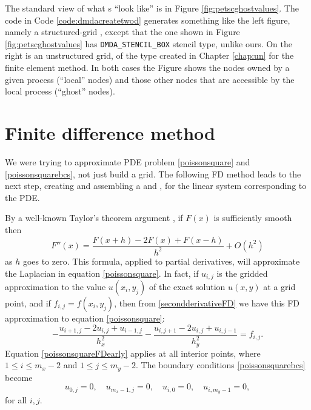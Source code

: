 The standard \PETSc view of what \pDM s ``look like'' is in Figure \ref{fig:petscghostvalues}.  The code in Code \ref{code:dmdacreatetwod} generates something like the left figure, namely a structured-grid \pDM, except that the one shown in Figure \ref{fig:petscghostvalues} has \texttt{DMDA\_STENCIL\_BOX} stencil type, unlike ours.  On the right is an unstructured grid, of the type created in Chapter \ref{chap:un} for the finite element method.  In both cases the Figure shows the nodes owned by a given process (``local'' nodes) and those other nodes that are accessible by the local process (``ghost'' nodes).


\section{Finite difference method}

We were trying to approximate PDE problem \eqref{poissonsquare} and \eqref{poissonsquarebcs}, not just build a grid.  The following FD method leads to the next step, creating and assembling a \pMat and \pVecs, for the linear system corresponding to the PDE.

By a well-known Taylor's theorem argument \citep{MortonMayers2005}, if $F(x)$ is sufficiently smooth then
\begin{equation}
   F''(x) = \frac{F(x+h) - 2 F(x) + F(x-h)}{h^2} + O(h^2)  \label{secondderivativeFD}
\end{equation}
as $h$ goes to zero.  This formula, applied to partial derivatives, will approximate the Laplacian in equation \eqref{poissonsquare}.  In fact, if $u_{i,j}$ is the gridded approximation to the value $u(x_i,y_j)$ of the exact solution $u(x,y)$ at a grid point, and if $f_{i,j} = f(x_i,y_j)$, then from \eqref{secondderivativeFD} we have this FD approximation to equation \eqref{poissonsquare}:
\begin{equation}
- \frac{u_{i+1,j} - 2 u_{i,j} + u_{i-1,j}}{h_x^2} - \frac{u_{i,j+1} - 2 u_{i,j} + u_{i,j-1}}{h_y^2} = f_{i,j}. \label{poissonsquareFDearly}
\end{equation}
Equation \eqref{poissonsquareFDearly} applies at all interior points, where $1 \le i \le m_x-2$ and $1 \le j \le m_y-2$.  The boundary conditions \eqref{poissonsquarebcs} become
\begin{equation}
u_{0,j} = 0, \quad u_{m_x-1,j} = 0, \quad u_{i,0} = 0, \quad u_{i,m_y-1} = 0, \label{poissonsquareFDbcs}
\end{equation}
for all $i,j$.

